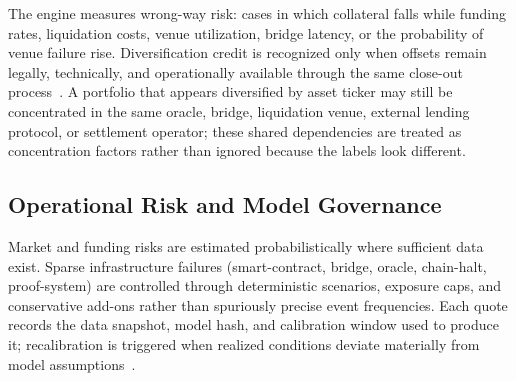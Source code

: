 The engine measures wrong-way risk: cases in which collateral falls while
funding rates, liquidation costs, venue utilization, bridge latency, or the
probability of venue failure rise. Diversification credit is recognized only when
offsets remain legally, technically, and operationally available through the
same close-out process~\cite{gordy2003,zbandut2025}. A portfolio that appears
diversified by asset ticker may still be concentrated in the same oracle, bridge,
liquidation venue, external lending protocol, or settlement operator; these
shared dependencies are treated as concentration factors rather than ignored
because the labels look different.

\subsection{Operational Risk and Model Governance}

Market and funding risks are estimated probabilistically where sufficient data exist. Sparse infrastructure failures (smart-contract, bridge, oracle, chain-halt, proof-system) are controlled through deterministic scenarios, exposure caps, and conservative add-ons rather than spuriously precise event frequencies. Each quote records the data snapshot, model hash, and calibration window used to produce it; recalibration is triggered when realized conditions deviate materially from model assumptions~\cite{bartoletti2025,zbandut2026}.
